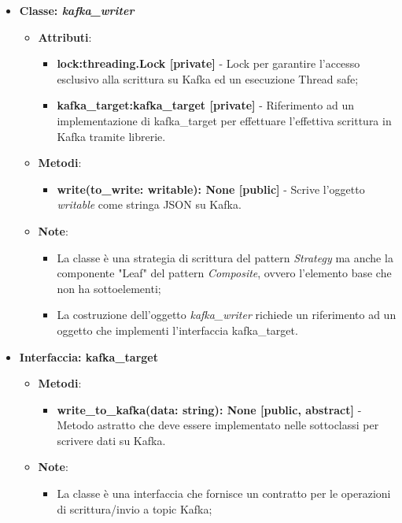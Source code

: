 \begin{itemize}
\begin{itemize}
\begin{itemize}
        \end{itemize}
    \end{itemize}
    \item{\textbf{Classe: \textit{kafka\_writer}}}
    \begin{itemize}
    \item\textbf{Attributi}:
        \begin{itemize}
        \item \textbf{lock:threading.Lock [private]} - Lock per garantire l'accesso esclusivo alla scrittura su Kafka ed un esecuzione Thread safe;
        \item \textbf{kafka\_target:kafka\_target [private]} - Riferimento ad un implementazione di kafka\_target per effettuare l'effettiva scrittura in Kafka tramite librerie.
    \end{itemize}
    \item \textbf{Metodi}:
    \begin{itemize}
        \item \textbf{write(to\_write: writable): None [public]} - Scrive l'oggetto \textit{writable} come stringa JSON su Kafka.
    \end{itemize}
    \item\textbf{Note}:
        \begin{itemize}
            \item La classe è una strategia di scrittura del pattern \textit{Strategy} ma anche la componente "Leaf" del pattern \textit{Composite}, ovvero l'elemento base che non ha sottoelementi;
            \item La costruzione dell'oggetto \textit{kafka\_writer} richiede un riferimento ad un oggetto che implementi l'interfaccia kafka\_target.
        \end{itemize}
    \end{itemize}
    \item{\textbf{Interfaccia: kafka\_target}}
    \begin{itemize}
        \item \textbf{Metodi}:
        \begin{itemize}
            \item \textbf{write\_to\_kafka(data: string): None [public, abstract]} - Metodo astratto che deve essere implementato nelle sottoclassi per scrivere dati su Kafka.
        \end{itemize}
        \item\textbf{Note}:
        \begin{itemize}
            \item La classe è una interfaccia che fornisce un contratto per le operazioni di scrittura/invio a topic Kafka;

\end{itemize}
\end{itemize}
\end{itemize}
